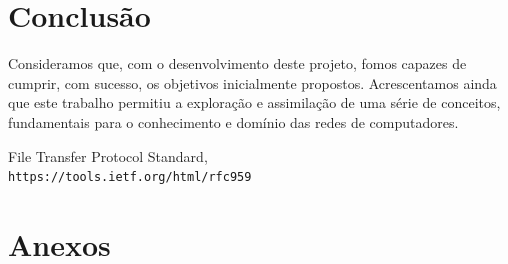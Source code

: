 \documentclass{article}
\begin{document}
\section{Conclusão}
Consideramos que, com o desenvolvimento deste projeto, fomos capazes de cumprir, com sucesso, os objetivos inicialmente propostos.  Acrescentamos ainda que este trabalho permitiu a exploração e assimilação de uma série de conceitos, fundamentais para o conhecimento e domínio das redes de computadores.  
\begin{thebibliography}{1}
    File Transfer Protocol Standard,
    \\\texttt{https://tools.ietf.org/html/rfc959}
\end{thebibliography}
\pagebreak

\section{Anexos}
\end{document}
